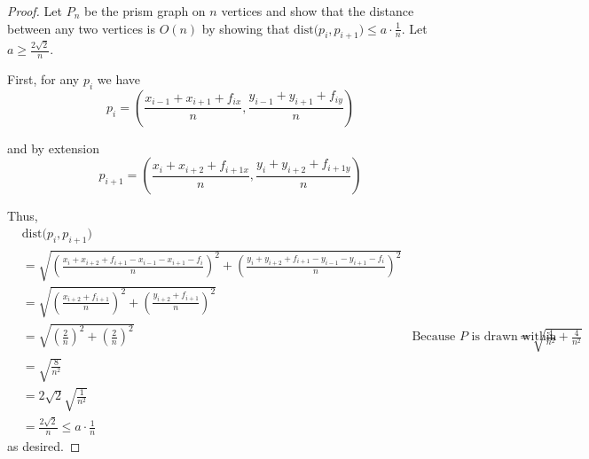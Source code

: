 \documentclass[11pt]{article}
\begin{document}
\begin{proof}
    Let $P_n$ be the prism graph on $n$ vertices and show that the distance between any two vertices is $O(n)$ by showing that $\text{dist(}{p_i, p_{i+1})} \leq a \cdot \frac{1}{n}$. Let $a \geq \frac{2\sqrt{2}}{n}$.
    
    \bigskip
    
    First, for any $p_i$ we have
    \[
        p_i = \left(
            \frac{x_{i-1} + x_{i+1} + f_{ix}}{n} , %
            \frac{y_{i-1} + y_{i+1} + f_{iy}}{n} %
        \right)
    \]
    
    and by extension
    \[
        p_{i + 1} = \left(
        \frac{x_i + x_{i+2} + f_{i + 1x}}{n} , %
        \frac{y_i + y_{i+2} + f_{i + 1y}}{n} %
        \right)
    \]
    
    Thus,
    \[\begin{aligned}
    &  \text{dist(}{p_i, p_{i + 1}}) \\
    &= \sqrt{
        \left(\frac{x_i + x_{i+2} + f_{i+1} - x_{i-1} - x_{i+1} - f_i}{n}\right)^2 +
        \left(\frac{y_i + y_{i+2} + f_{i+1} - y_{i-1} - y_{i+1} - f_i}{n}\right)^2
    } \\
    &= \sqrt{
        \left(\frac{x_{i+2} + f_{i+1}}{n}\right)^2 +
        \left(\frac{y_{i+2} + f_{i+1}}{n}\right)^2
        } \\
    &= \sqrt{
        \left(\frac{2}{n}\right)^2 +
        \left(\frac{2}{n}\right)^2
    } 
    &\text{Because $P$ is drawn within unit square}
    &= \sqrt{\frac{4}{n^2} + \frac{4}{n^2}} \\
    &= \sqrt{\frac{8}{n^2}} \\
    &= 2\sqrt{2}\sqrt{\frac{1}{n^2}} \\
    &= \frac{2\sqrt{2}}{n} \leq a \cdot \frac{1}{n}
    \end{aligned}\]
    as desired.    
\end{proof}
\end{document}
